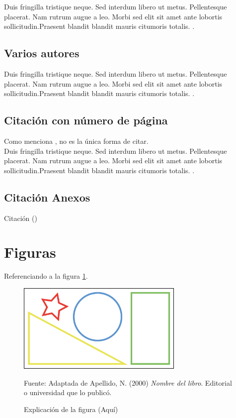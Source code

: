 Duis fringilla tristique neque. Sed interdum libero ut metus.
Pellentesque placerat. Nam rutrum augue a leo. Morbi sed 
elit sit amet ante lobortis sollicitudin.Praesent blandit 
blandit mauris citumoris totalis. \cite{libro:ejemplo}.

\subsection*{Varios autores}

Duis fringilla tristique neque. Sed interdum libero ut metus.
Pellentesque placerat. Nam rutrum augue a leo. Morbi sed 
elit sit amet ante lobortis sollicitudin.Praesent blandit 
blandit mauris citumoris totalis. \cite{libro:ejemplo_varios_autores}.

\subsection{Citación con número de página}

Como menciona , no es la única
forma de citar.\\

Duis fringilla tristique neque. Sed interdum libero ut metus.
Pellentesque placerat. Nam rutrum augue a leo. Morbi sed 
elit sit amet ante lobortis sollicitudin.Praesent blandit 
blandit mauris citumoris totalis. \cite[p.~7-12]{libro:ejemplo_varios_autores}.

\subsection{Citación Anexos}
Citación ()

\section{Figuras}
Referenciando a la figura \ref{fig:ejemplo}.

\begin{figure}[H]
    \begin{center}
        \includegraphics[width=8cm]{img/figura_ejemplo.png}
    \end{center}
    \caption{Explicación de la figura (Aquí)}
    Fuente: Adaptada de Apellido, N. (2000) \textit{Nombre del libro}.
    Editorial o universidad que lo publicó.
    \label{fig:ejemplo}
\end{figure}

